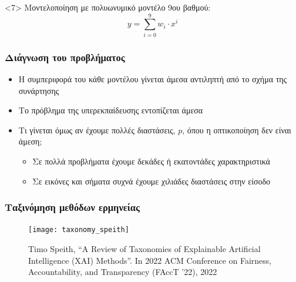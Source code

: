 \begin{frame}
\begin{onlyenv}
    \begin{center}
      \scalebox{0.5}{
        
      }
    \end{center}
  \end{onlyenv}
  \begin{onlyenv}<7>
    Μοντελοποίηση με πολυωνυμικό μοντέλο 9ου βαθμού:
    \begin{equation*}
      y = \sum_{i=0}^{9}w_i\cdot x^{i}
    \end{equation*}
    \begin{center}
      \scalebox{0.5}{
        
      }
    \end{center}
  \end{onlyenv}
\end{frame}

\begin{frame}
  \frametitle{Διάγνωση του προβλήματος}

  \begin{itemize}
  \item Η συμπεριφορά του κάθε μοντέλου γίνεται άμεσα αντιληπτή από
    το σχήμα της συνάρτησης
  \item Το πρόβλημα της υπερεκπαίδευσης εντοπίζεται άμεσα
  \item Τι γίνεται όμως αν έχουμε πολλές διαστάσεις, $p$, όπου η οπτικοποίηση δεν
    είναι άμεση;
    \begin{itemize}
    \item Σε πολλά προβλήματα έχουμε δεκάδες ή εκατοντάδες χαρακτηριστικά
    \item Σε εικόνες και σήματα συχνά έχουμε χιλιάδες διαστάσεις στην είσοδο
    \end{itemize}
  \end{itemize}
\end{frame}

\begin{frame}
  \frametitle{Ταξινόμηση μεθόδων ερμηνείας}
  \begin{figure}
    \texttt{[image: taxonomy\_speith]}
    \caption{\footnotesize Timo Speith, ``A Review of Taxonomies of Explainable
      Artificial Intelligence (XAI) Methods''. In 2022 ACM Conference on
      Fairness, Accountability, and Transparency (FAccT '22), 2022}
  \end{figure}
\end{frame}

